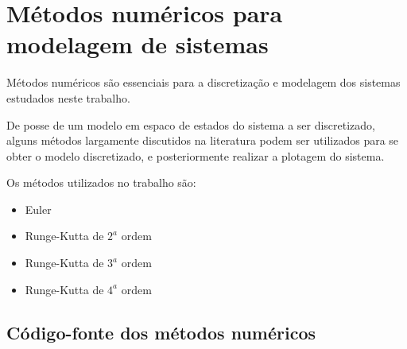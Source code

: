 \chapter{Métodos numéricos para modelagem de sistemas}

    Métodos numéricos são essenciais para a discretização e modelagem
    dos sistemas estudados neste trabalho.
    
    De posse de um modelo em espaco de estados do sistema a ser discretizado,
    alguns métodos largamente discutidos na literatura podem ser utilizados
    para se obter o modelo discretizado, e posteriormente realizar a plotagem
    do sistema.
    
    Os métodos utilizados no trabalho são:
    
    \begin{itemize}
        \item Euler
        \item Runge-Kutta de $2^a$ ordem
        \item Runge-Kutta de $3^a$ ordem
        \item Runge-Kutta de $4^a$ ordem
    \end{itemize}
    

\section{Código-fonte dos métodos numéricos}
    

